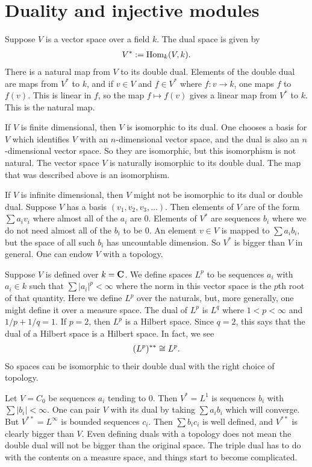 \documentclass[11pt, oneside,margin=1in]{article}
\begin{document}
\section{Duality and injective modules}
Suppose $V$ is a vector space over a field $k$. The dual space is given by 
\begin{align*}
	V^* := \operatorname{Hom}_{k}(V, k).
\end{align*}
There is a natural map from $V$ to its double dual. Elements of the double dual are maps from $V^*$ to $k$, and if $v\in V$ and $f\in V^*$ where $f: v\longrightarrow k$, one maps $f$ to $f(v)$. This is linear in $f$, so the map $f\longmapsto f(v)$ gives a linear map from $V^*$ to $k$. This is the natural map.

If $V$ is finite dimensional, then $V$ is isomorphic to its dual. One chooses a basis for $V$ which identifies $V$ with an $n$-dimensional vector space, and the dual is also an $n$-dimensional vector space. So they are isomorphic, but this isomorphism is not natural. The vector space $V$ is naturally isomorphic to its double dual. The map that was described above is an isomorphism.

If $V$ is infinite dimensional, then $V$ might not be isomorphic to its dual or double dual. Suppose $V$ has a basis $(v_1,v_2,v_3,\hdots)$. Then elements of $V$ are of the form $\sum a_iv_i$ where almost all of the $a_i$ are $0$. Elements of $V^*$ are sequences $b_i$ where we do not need almost all of the $b_i$ to be $0$. An element $v\in V$ is mapped to $\sum a_ib_i$, but the space of all such $b_i$ has uncountable dimension. So $V^*$ is bigger than $V$ in general. One can endow $V$ with a topology. 
\begin{example}[$L^p$ spaces]\label{riesz}
Suppose $V$ is defined over $k=\mathbf C$. We define spaces $L^p$ to be sequences $a_i$ with $a_i\in k$ such that $\sum \left\lvert a_i \right\rvert ^p < \infty$ where the norm in this vector space is the $p$th root of that quantity. Here we define $L^p$ over the naturals, but, more generally, one might define it over a measure space. The dual of $L^p$ is $L^q$ where $1<p<\infty$ and $1/p + 1/q = 1$. If $p=2$, then $L^p$ is a Hilbert space. Since $q=2$, this says that the dual of a Hilbert space is a Hilbert space. In fact, we see
\begin{align*}
	(L^p) ^{**} \cong L^p.
\end{align*}
So spaces can be isomorphic to their double dual with the right choice of topology.
\end{example}
\begin{example}[ ]\label{}
Let $V=C_0$ be sequences $a_i$ tending to $0$. Then $V^*=L^1$ is sequences $b_i$ with $\sum \left\lvert b_i \right\rvert <\infty$. One can pair $V$ with its dual by taking $\sum a_ib_i$ which will converge. But $V^{**}=L^\infty$ is bounded sequences $c_i$. Then $\sum b_ic_i$ is well defined, and $V^{**}$ is clearly bigger than $V$. Even defining duals with a topology does not mean the double dual will not be bigger than the original space. The triple dual has to do with the contents on a measure space, and things start to become complicated. 
\end{example}
\end{document}
